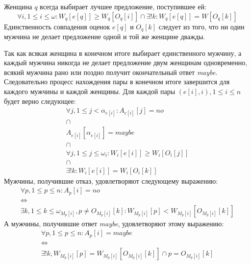 \documentclass{article}
\begin{document}
Женщина \( q \) всегда выбирает лучшее предложение, поступившее ей:
\begin{displaymath}
\forall i, 1 \leq i \leq \omega : W_q[e[q]] \geq W_q[O_q[i]] \cap \exists ! k : W_q[e[q]] = W[O_q[k]]
\end{displaymath}
Единственность совпадения оценок \( e[q] \) и \( O_q[k] \) следует из того, что ни один мужчина не делает предложение одной и той же женщине
дважды.

Так как всякая женщина в конечном итоге выбирает единственного мужчину, а каждый мужчина никогда не делает предложение двум женщинам одновременно,
всякий мужчина рано или поздно получит окончательный ответ \emph{maybe}. Следовательно процесс нахождения пары в конечном итоге завершится для каждого
мужчины и каждой женщины. Для каждой пары \( (e[i],i), 1 \leq i \leq n \) будет верно следующее:
\begin{equation}
    \label{pr:final1}
    \begin{array}{c}
    \forall j, 1 \leq j < \alpha_{e[i]} : A_{e[i]}[j] = no \\
    \cap \\
    A_{e[i]}[\alpha_{e[i]}] = maybe \\
    \cap \\
    \forall j, 1 \leq j \leq \omega_i : W_i[e[i]] \geq W_i[O_i[j]] \\
    \cap \\
    \exists ! k : W_i[e[i]] = W_i[O_i[k]]
    \end{array}
\end{equation}
Мужчины, получившие отказ, удовлетворяют следующему выражению:
\begin{displaymath}
\begin{array}{c}
\forall p, 1 \leq p \leq n : A_p[i] = no \\
\Leftrightarrow \\
\exists k, 1 \leq k \leq \omega_{M_p[i]}, p \neq O_{M_p[i]}[k] : W_{M_p[i]}[p] < W_{M_p[i]}[O_{M_p[i]}[k]]
\end{array}
\end{displaymath}
А мужчины, получившие ответ \emph{maybe}, удовлетворяют этому выражению:
\begin{displaymath}
\begin{array}{c}
\forall p, 1 \leq p \leq n : A_p[i] = maybe \\
\Leftrightarrow \\
\exists ! k, W_{M_p[i]}[p] = W_{M_p[i]}[O_{M_p[i]}[k]] \cap p = O_{M_p[i]}[k]
\end{array}
\end{displaymath}
\end{document}
